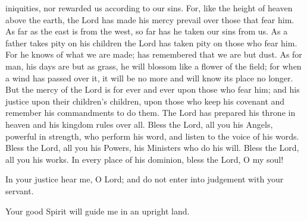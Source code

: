 \documentclass{article}
\begin{document}
\begin{service}
\begin{multicols}{2}
{  iniquities, nor rewarded us according to our sins. For, like the height of
  heaven above the earth, the Lord has made his mercy prevail over those that
  fear him. As far as the east is from the west, so far has he taken our sins from
  us. As a father takes pity on his children the Lord has taken pity on those who
  fear him. For he knows of what we are made; has remembered that we are but dust.
  As for man, his days are but as grass, he will blossom like a flower of the
  field; for when a wind has passed over it, it will be no more and will know its
  place no longer. But the mercy of the Lord is for ever and ever upon those
  who fear him; and his justice upon their children's children, upon those who
  keep his covenant and remember his commandments to do them. The Lord
  has prepared his throne in heaven and his kingdom rules over all. Bless the
  Lord, all you his Angels, powerful in strength, who perform his word, and
  listen to the voice of his words. Bless the Lord, all you his Powers, his
  Ministers who do his will. Bless the Lord, all you his works. In every place
  of his dominion, bless the Lord, O my soul!
  \andagain
  \item In your justice hear me, O Lord; and do not enter into judgement with
  your servant. 
  \item Your good Spirit will guide me in an upright land.
}
\rest
\entry{
  \glorybothnow
  \item \alleluia
}
\end{multicols}
\pagebreak

\end{service}
\end{document}
